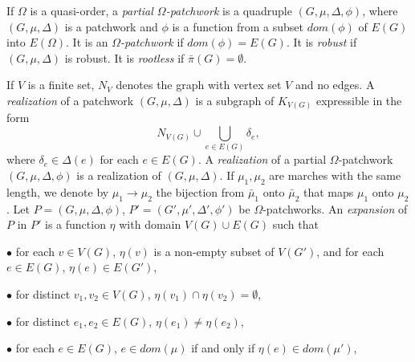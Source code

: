 If $\Omega$ is a quasi-order, a \textit{partial $\Omega$-patchwork} is a quadruple $(G, \mu, \Delta, \phi)$, where $(G, \mu, \Delta)$ is a patchwork and $\phi$ is a function from a subset $dom(\phi)$ of $E(G)$ into $E(\Omega)$. It is an \textit{$\Omega$-patchwork} if $dom(\phi) = E(G)$. It is \textit{robust} if $(G, \mu, \Delta)$ is robust. It is \textit{rootless} if $\bar{\pi}(G) = \emptyset$.

If $V$ is a finite set, $N_V$ denotes the graph with vertex set $V$ and no edges. A \textit{realization} of a patchwork $(G, \mu, \Delta)$ is a subgraph of $K_{V(G)}$ expressible in the form
\begin{equation*}
N_{V(G)} \cup \bigcup_{e \in E(G)} \delta_e,
\end{equation*}
where $\delta_e \in \Delta(e)$ for each $e \in E(G)$. A \textit{realization} of a partial $\Omega$-patchwork $(G, \mu, \Delta, \phi)$ is a realization of $(G, \mu, \Delta)$. If $\mu_1, \mu_2$ are marches with the same length, we denote by $\mu_1 \to \mu_2$ the bijection from $\bar{\mu}_1$ onto $\bar{\mu}_2$ that maps $\mu_1$ onto $\mu_2$. Let $P = (G, \mu, \Delta, \phi)$, $P' = (G', \mu', \Delta', \phi')$ be $\Omega$-patchworks. An \textit{expansion} of $P$ in $P'$ is a function $\eta$ with domain $V(G) \cup E(G)$ such that

\hspace*{12pt}$\bullet$ for each $v \in V(G)$, $\eta(v)$ is a non-empty subset of $V(G')$, and for each $e \in E(G)$, $\eta(e) \in E(G')$,

\hspace*{12pt}$\bullet$ for distinct $v_1, v_2 \in V(G)$, $\eta(v_1) \cap \eta(v_2) = \emptyset$,

\hspace*{12pt}$\bullet$ for distinct $e_1, e_2 \in E(G)$, $\eta(e_1) \ne \eta(e_2)$,

\hspace*{12pt}$\bullet$ for each $e \in E(G)$, $e \in dom(\mu)$ if and only if $\eta(e) \in dom(\mu')$,
